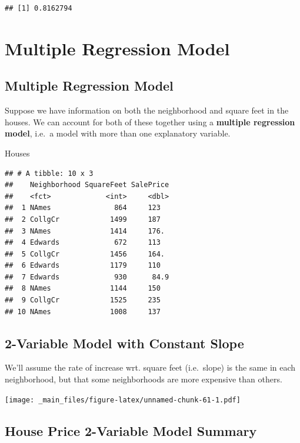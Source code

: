 \documentclass[]{book}
\newenvironment{Shaded}{\begin{snugshade}}{\end{snugshade}}
\newcommand{\NormalTok}[1]{#1}
\begin{document}
\begin{verbatim}
## [1] 0.8162794
\end{verbatim}

\section{Multiple Regression Model}\label{multiple-regression-model}

\subsection{Multiple Regression
Model}\label{multiple-regression-model-1}

Suppose we have information on both the neighborhood and square feet in
the houses. We can account for both of these together using a
\textbf{multiple regression model}, i.e.~a model with more than one
explanatory variable.

\begin{Shaded}
\begin{Highlighting}[]
\NormalTok{Houses}
\end{Highlighting}
\end{Shaded}

\begin{verbatim}
## # A tibble: 10 x 3
##    Neighborhood SquareFeet SalePrice
##    <fct>             <int>     <dbl>
##  1 NAmes               864     123  
##  2 CollgCr            1499     187  
##  3 NAmes              1414     176. 
##  4 Edwards             672     113  
##  5 CollgCr            1456     164. 
##  6 Edwards            1179     110  
##  7 Edwards             930      84.9
##  8 NAmes              1144     150  
##  9 CollgCr            1525     235  
## 10 NAmes              1008     137
\end{verbatim}

\subsection{2-Variable Model with Constant
Slope}\label{variable-model-with-constant-slope}

We'll assume the rate of increase wrt. square feet (i.e.~slope) is the
same in each neighborhood, but that some neighborhoods are more
expensive than others.

\texttt{[image: \_main\_files/figure-latex/unnamed-chunk-61-1.pdf]}

\subsection{House Price 2-Variable Model
Summary}\label{house-price-2-variable-model-summary}
\end{document}
